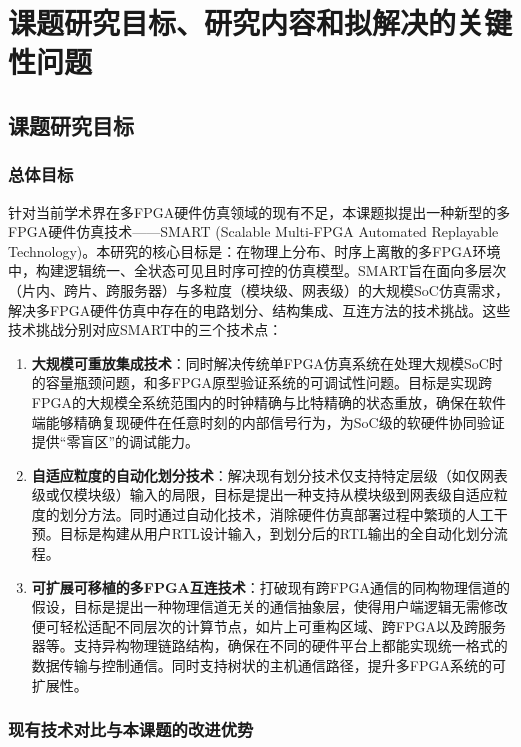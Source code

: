 \chapter{课题研究目标、研究内容和拟解决的关键性问题}

\section{课题研究目标}

\subsection{总体目标}

针对当前学术界在多FPGA硬件仿真领域的现有不足，本课题拟提出一种新型的多FPGA硬件仿真技术——SMART (Scalable Multi-FPGA Automated Replayable Technology)。本研究的核心目标是：在物理上分布、时序上离散的多FPGA环境中，构建逻辑统一、全状态可见且时序可控的仿真模型。SMART旨在面向多层次（片内、跨片、跨服务器）与多粒度（模块级、网表级）的大规模SoC仿真需求，解决多FPGA硬件仿真中存在的电路划分、结构集成、互连方法的技术挑战。这些技术挑战分别对应SMART中的三个技术点：

\begin{enumerate}
    \item \textbf{大规模可重放集成技术}：同时解决传统单FPGA仿真系统在处理大规模SoC时的容量瓶颈问题，和多FPGA原型验证系统的可调试性问题。目标是实现跨FPGA的大规模全系统范围内的时钟精确与比特精确的状态重放，确保在软件端能够精确复现硬件在任意时刻的内部信号行为，为SoC级的软硬件协同验证提供“零盲区”的调试能力。
    
    \item \textbf{自适应粒度的自动化划分技术}：解决现有划分技术仅支持特定层级（如仅网表级或仅模块级）输入的局限，目标是提出一种支持从模块级到网表级自适应粒度的划分方法。同时通过自动化技术，消除硬件仿真部署过程中繁琐的人工干预。目标是构建从用户RTL设计输入，到划分后的RTL输出的全自动化划分流程。
    
    \item \textbf{可扩展可移植的多FPGA互连技术}：打破现有跨FPGA通信的同构物理信道的假设，目标是提出一种物理信道无关的通信抽象层，使得用户端逻辑无需修改便可轻松适配不同层次的计算节点，如片上可重构区域、跨FPGA以及跨服务器等。支持异构物理链路结构，确保在不同的硬件平台上都能实现统一格式的数据传输与控制通信。同时支持树状的主机通信路径，提升多FPGA系统的可扩展性。
\end{enumerate}

\subsection{现有技术对比与本课题的改进优势}

